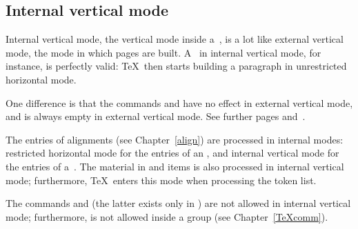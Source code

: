 \documentclass{book}
\begin{document}
\subsection{Internal vertical mode}

Internal vertical mode, the vertical mode inside
a~, is a lot like external vertical
mode, the mode in which pages are built.
A~ in internal vertical mode,
for instance, is perfectly valid:
\TeX\ then starts building a paragraph in
unrestricted horizontal mode.

One difference is that the commands
 and  have no effect
in external vertical mode, and
 is always empty in external vertical mode.
See further pages \pageref{lastbox} and~\pageref{unskip}.

The entries of alignments (see Chapter~\ref{align}) are 
processed in internal modes: restricted horizontal mode
for the entries of an , and internal vertical
mode for the entries of a~.
The material in    and  items
is also processed in internal vertical mode; furthermore,
\TeX\ enters this mode when processing the  token list.

The commands  and  (the latter exists only in \IniTeX)
are not allowed in
internal vertical mode; furthermore,  is not allowed
inside a group (see Chapter~\ref{TeXcomm}).
\end{document}
